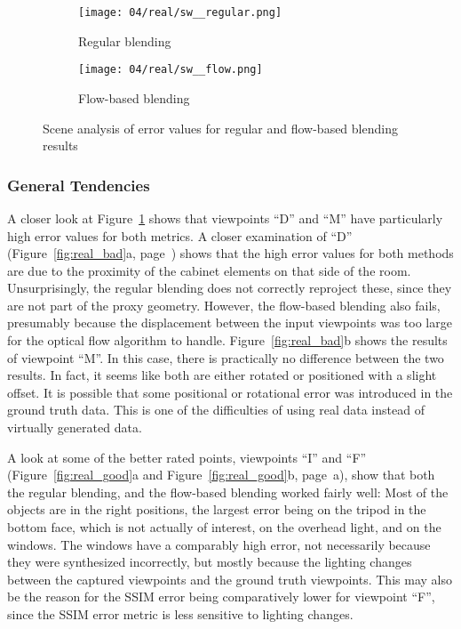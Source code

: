 \begin{figure}
\centering
    \hfill
    \begin{subfigure}[b]{0.45\textwidth}
            \centering
            \texttt{[image: 04/real/sw\_\_regular.png]}
            \caption{Regular blending}
    \end{subfigure}
    \hfill
    \begin{subfigure}[b]{0.45\textwidth}
            \centering
            \texttt{[image: 04/real/sw\_\_flow.png]}
            \caption{Flow-based blending}
    \end{subfigure}
    \hfill
  \caption{Scene analysis of error values for regular and flow-based blending results} \label{fig:real_scene_analysis}
\end{figure}



\subsubsection{General Tendencies}
A closer look at Figure~\ref{fig:real_scene_analysis} shows that viewpoints ``D'' and ``M'' have particularly high error values for both metrics. A closer examination of ``D'' (Figure~\ref{fig:real_bad}a, page~\pageref{fig:real_bad}) shows that the high error values for both methods are due to the proximity of the cabinet elements on that side of the room. Unsurprisingly, the regular blending does not correctly reproject these, since they are not part of the proxy geometry. However, the flow-based blending also fails, presumably because the displacement between the input viewpoints was too large for the optical flow algorithm to handle. Figure~\ref{fig:real_bad}b shows the results of viewpoint ``M''. In this case, there is practically no difference between the two results. In fact, it seems like both are either rotated or positioned with a slight offset. It is possible that some positional or rotational error was introduced in the ground truth data. This is one of the difficulties of using real data instead of virtually generated data.

A look at some of the better rated points, viewpoints ``I'' and ``F'' (Figure~\ref{fig:real_good}a and Figure~\ref{fig:real_good}b, page~\pageref{fig:real_good}a), show that both the regular blending, and the flow-based blending worked fairly well: Most of the objects are in the right positions, the largest error being on the tripod in the bottom face, which is not actually of interest, on the overhead light, and on the windows. The windows have a comparably high error, not necessarily because they were synthesized incorrectly, but mostly because the lighting changes between the captured viewpoints and the ground truth viewpoints. This may also be the reason for the SSIM error being comparatively lower for viewpoint ``F'', since the SSIM error metric is less sensitive to lighting changes.

